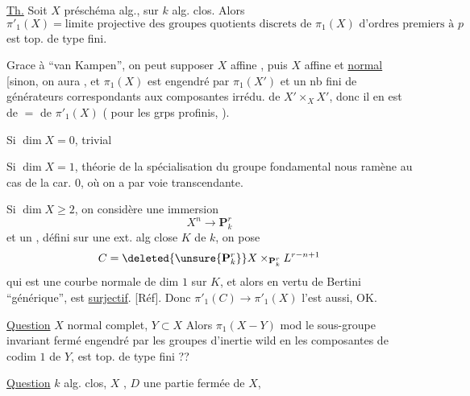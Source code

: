 \uline{Th.} Soit $X$ préschéma alg., sur $k$ alg. clos. Alors
\[
\pi'_1(X)=\text{limite projective des groupes quotients discrets de }\pi_1(X)
\text{ d'ordres premiers à }p
\]
est top. de type fini.

Grace à ``van Kampen'', on peut supposer $X$ affine
,
puis $X$ affine et \uline{normal}
[sinon, on aura
, et $\pi_1(X)$ est engendré par $\pi_1(X')$ et un nb fini de générateurs
correspondants aux composantes irrédu. de $X'\times_X X'$, donc il en est de $=$
de $\pi'_1(X)$
( pour les grps profinis,
). 

Si $\dim X=0$, trivial

Si $\dim X=1$, théorie de la spécialisation du groupe fondamental
nous ramène au cas de la car.  $0$, où on a
 par voie transcendante.

Si $\dim X\geq2$, on considère une immersion
\[
X^n\longrightarrow \mathbf P_k^r
\]
et un  
, défini sur une
ext. alg close $K$ de $k$, on pose
\[
C=\deleted{\unsure{\mathbf P_k^r}}X\times_{\mathbf P_k^r}L^{r-n+1}
\]
qui est une courbe normale de dim $1$ sur $K$, et alors en vertu de
Bertini ``générique'',
est \uline{surjectif}. [Réf]. Donc $\pi'_1(C)\to\pi'_1(X)$ l'est
aussi, OK.

\uline{Question} $X$ normal complet, $Y\subset X$
Alors $\pi_1(X-Y)$ mod le sous-groupe invariant fermé engendré
par les groupes d'inertie wild en les composantes de
codim $1$ de $Y$, est  top. de type fini ??

\uline{Question}
$k$ alg. clos,
$X$ ,
$D$ une partie fermée de $X$, 

